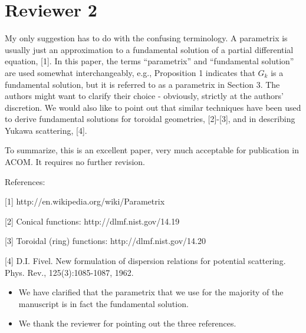 \documentclass[11pt]{article}
\newcommand{\comment}[1]{{\color{blue} #1}}
\begin{document}
\section*{Reviewer 2}
\comment{My only suggestion
has to do with the confusing terminology. A parametrix is usually just
an approximation to a fundamental solution of a partial differential
equation, [1]. In this paper, the terms ``parametrix'' and
``fundamental solution'' are used somewhat interchangeably, e.g.,
Proposition 1 indicates that $G_k$ is a fundamental solution, but it
is referred to as a parametrix in Section 3. The authors might want to
clarify their choice - obviously, strictly at the authors'
discretion. We would also like to point out that similar techniques
have been used to derive fundamental solutions for toroidal
geometries, [2]-[3], and in describing Yukawa scattering, [4].

To summarize, this is an excellent paper, very much acceptable for
publication in ACOM. It requires no further revision.

References:

[1] http://en.wikipedia.org/wiki/Parametrix

[2] Conical functions: http://dlmf.nist.gov/14.19

[3] Toroidal (ring) functions: http://dlmf.nist.gov/14.20

[4] D.I. Fivel. New formulation of dispersion relations for
potential scattering. Phys. Rev., 125(3):1085-1087, 1962.
}

\begin{itemize}
  \item We have clarified that the parametrix that we use for the
  majority of the manuscript is in fact the fundamental solution.

  \item We thank the reviewer for pointing out the three references.
\end{itemize}
\end{document}
